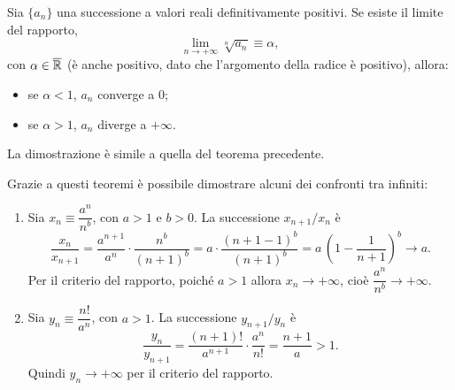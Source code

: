 \begin{teorema}
\label{t:criterio_della_radice_successioni}
Sia $\{a_n\}$ una successione a valori reali definitivamente positivi. Se esiste il limite del rapporto,
\[
\lim_{n\to +\infty} \sqrt[n]{a_n}\equiv\alpha,
\]
con $\alpha\in\overline{\mathbb{R}}$ (è anche positivo, dato che l'argomento della radice è positivo), allora:
\begin{itemize}
	\item se $\alpha<1$, $a_n$ converge a 0;
	\item se $\alpha>1$, $a_n$ diverge a $+\infty$.
\end{itemize}
\end{teorema}
La dimostrazione è simile a quella del teorema precedente.

Grazie a questi teoremi è possibile dimostrare alcuni dei confronti tra infiniti:
\begin{enumerate}
\item Sia $x_n\equiv\dfrac{a^n}{n^b}$, con $a>1$ e $b>0$. La successione $x_{n+1}/x_n$ è
\[
\frac{x_n}{x_{n+1}}=\frac{a^{n+1}}{a^n}\cdot\frac{n^b}{(n+1)^b}=a\cdot\frac{(n+1-1)^b}{(n+1)^b}=a\,\left(1-\frac{1}{n+1}\right)^b\to a.
\]
Per il criterio del rapporto, poiché $a>1$ allora $x_n\to +\infty$, cioè $\dfrac{a^n}{n^b}\to +\infty$.
\item Sia $y_n\equiv\dfrac{n!}{a^n}$, con $a>1$. La successione $y_{n+1}/y_n$ è
\[
\frac{y_n}{y_{n+1}}=\frac{(n+1)!}{a^{n+1}}\cdot\frac{a^n}{n!}=\frac{n+1}{a}>1.
\]
Quindi $y_n\to +\infty$ per il criterio del rapporto.
\end{enumerate}

